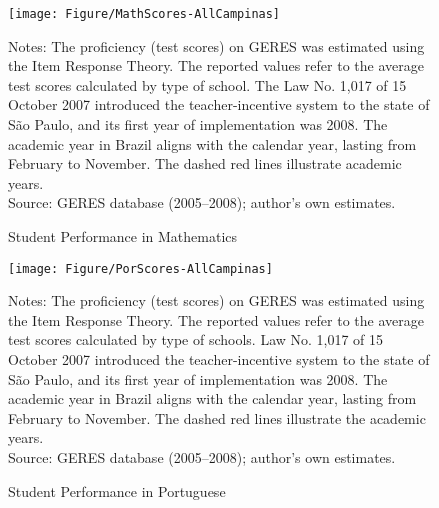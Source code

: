 \documentclass[a4paper, 12pt]{article}
\begin{document}
\begin{figure}[H]
\centering
\captionsetup{justification=centering,margin=1.5cm}
      \texttt{[image: Figure/MathScores-AllCampinas]}
       \vspace{0cm}
          \begin{minipage}{0.86\textwidth} %
{\scriptsize
Notes: The proficiency (test scores) on GERES was estimated using the Item Response Theory. The reported values refer to the average test scores calculated by type of school. The Law No. 1,017 of 15 October 2007 introduced the teacher-incentive system to the state of São Paulo, and its first year of implementation was 2008. The academic year in Brazil aligns with the calendar year, lasting from February to November. The dashed red lines illustrate academic years.  \\
Source: GERES database (2005–2008); author’s own estimates.\par}
\end{minipage}
\caption{Student Performance in Mathematics}
\label{fig:Math-RegStud}
\end{figure} 




\begin{figure}[H]
\centering
\captionsetup{justification=centering,margin=1.5cm}
      \texttt{[image: Figure/PorScores-AllCampinas]}
       \vspace{0cm}
         \begin{minipage}{0.86\textwidth} %
{\scriptsize
Notes: The proficiency (test scores) on GERES was estimated using the Item Response Theory. The reported values refer to the average test scores calculated by type of schools. Law No. 1,017 of 15 October 2007 introduced the teacher-incentive system to the state of São Paulo, and its first year of implementation was 2008. The academic year in Brazil aligns with the calendar year, lasting from February to November. The dashed red lines illustrate the academic years.  \\
Source: GERES database (2005–2008); author’s own estimates.\par}
\end{minipage}
\caption{Student Performance in Portuguese}
\label{fig:Por-RegStud}
\end{figure} 
\end{document}
